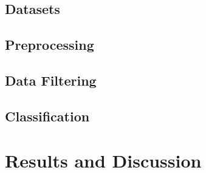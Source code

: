 \documentclass[12pt, english, openany]{book}
\begin{document}
\section{Datasets}

\section{Preprocessing}

\section{Data Filtering}

\section{Classification}

\chapter{Results and Discussion}





\end{document}
